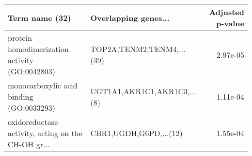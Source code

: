 \begin{tabular}{llr}
\toprule
                                    Term name (32) &        Overlapping genes... &  Adjusted p-value \\
\midrule
    protein homodimerization activity (GO:0042803) &   TOP2A,TENM2,TENM4,...(39) &          2.97e-05 \\
          monocarboxylic acid binding (GO:0033293) & UGT1A1,AKR1C1,AKR1C3,...(8) &          1.11e-04 \\
oxidoreductase activity, acting on the CH-OH gr... &      CBR1,UGDH,G6PD,...(12) &          1.55e-04 \\
\bottomrule
\end{tabular}
